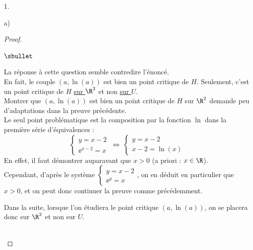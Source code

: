 \begin{noliste}{1.}
\begin{noliste}{a)}
\begin{proof}
      
      
      \newpage
      
      
      \begin{remark}
       \begin{noliste}{$\sbullet$}
        \item La réponse à cette question semble contredire l'énoncé.\\
        En fait, le couple $(a,\ln(a))$ est bien un point critique de 
        $H$. Seulement, c'est un point critique de $H$ \underline{sur 
        $\R^2$} et non \underline{sur $U$}.\\[.1cm]
        Montrer que $(a,\ln(a))$ est bien un point critique de $H$ sur 
        $\R^2$ demande peu d'adaptations dans la preuve précédente.\\
        Le seul point problématique est la 
        composition par la fonction $\ln$ dans la première série 
        d'équivalences :
        \[
          \left\{
          \begin{array}{l}
            y = x-2\\
            \ee^{x-2} = x
          \end{array}
          \right.
          \ \Leftrightarrow \
          \left\{
          \begin{array}{l}
            y = x-2\\[.1cm]
            x-2 = \ln(x)
          \end{array}
          \right.
        \]
        En effet, il faut démontrer auparavant que $x>0$ (a priori :
        $x\in \R$).\\
        Cependant, d'après le système $\left\{
        \begin{array}{l}
          y = x-2\\[.1cm]
          \ee^y = x
        \end{array}
        \right.$, on en déduit en particulier que $x>0$, et on peut donc
        continuer la preuve comme précédemment.
        
        \item Dans la suite, lorsque l'on étudiera le point critique 
        $(a,\ln(a))$, on se placera donc sur $\R^2$ et non sur $U$.
       \end{noliste}
      \end{remark}~\\[-1.4cm]
    \end{proof}
  \end{noliste}
  

\end{noliste}
